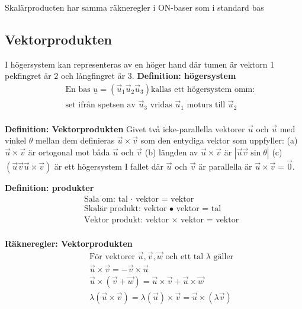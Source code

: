 \begin{multicols}{2}
Skalärproducten har samma räkneregler i ON-baser som i standard bas


\subsection{Vektorprodukten}
I högersystem kan representeras av en höger hand där tumen är vektorn 1 pekfingret är 2
och långfingret är 3.
\textbf{Definition: högersystem}
\begin{align*} 
  &\quad  \text{En bas $\underline{u} = (\vec{u}_1 \vec{u}_2 \vec{u}_3)$
    kallas ett högersystem omm: } \\
  &\quad  \text{set ifrån spetsen av $\vec{u}_3$ vridas $\vec{u}_1$ moturs till $\vec{u}_2$} \\
\end{align*}

\textbf{Definition: Vektorprodukten}
Givet två icke-parallella vektorer $\vec{u}$ och $\vec{u}$ med vinkel $\theta$
mellan dem definieras $\vec{u}\times\vec{v}$ som den entydiga vektor
som uppfyller:\newline
(a) $\vec{u}\times\vec{v}$ är ortogonal mot båda $\vec{u}$ och $\vec{v}$\newline
(b) längden av $\vec{u}\times\vec{v}$ är $|\vec{u}\vec{v}\sin{\theta}|$\newline
(c) $(\vec{u} \vec{v} \vec{u}\times\vec{v})$ är ett högersystem\newline
I fallet där $\vec{u}$ och $\vec{v}$ är parallella är
$\vec{u}\times\vec{v}=\vec{0}$.

\textbf{Definition: produkter}
\begin{align*} 
  &\quad  \text{Sala om: tal $\cdot$ vektor = vektor} \\
  &\quad  \text{Skalär produkt: vektor $\bullet$ vektor = tal} \\
  &\quad  \text{Vektor produkt: vektor $\times$ vektor = vektor} \\
\end{align*}

\textbf{Räkneregler: Vektorprodukten }
\begin{align*} 
  &\quad  \text{För vektorer $\vec{u},\vec{v},\vec{w}$ och ett tal $\lambda$ gäller} \\
  &\quad  \vec{u}\times\vec{v}=-\vec{v}\times\vec{u} \\
  &\quad  \vec{u}\times(\vec{v}+\vec{w}) = \vec{u}\times\vec{v}+\vec{u}\times\vec{w}  \\
  &\quad  \lambda(\vec{u}\times\vec{v}) = \lambda(\vec{u})\times\vec{v}
  = \vec{u}\times(\lambda\vec{v}) \\
\end{align*}


\end{multicols}
